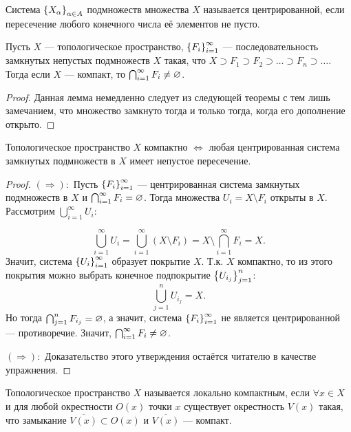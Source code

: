 \begin{definition}
    Система $\left\{X_{\alpha}\right\}_{\alpha \in A}$ подмножеств множества $X$ называется центрированной, если пересечение любого конечного числа её элементов не пусто.
\end{definition}

\begin{lemma}
    Пусть $X$ --- топологическое пространство, $\left\{F_{i}\right\}_{i = 1}^{\infty}$ --- последовательность замкнутых непустых подмножеств $X$ такая, что $X \supset F_1 \supset F_2 \supset \ldots \supset F_{n} \supset \ldots$. 
    Тогда если $X$ --- компакт, то $\bigcap_{i = 1}^{\infty} F_{i} \neq \varnothing$.
\end{lemma}
\begin{proof}
    Данная лемма немедленно следует из следующей теоремы с тем лишь замечанием, что множество замкнуто тогда и только тогда, когда его дополнение открыто.
\end{proof}

\begin{theorem}
    Топологическое пространство $X$ компактно $\Leftrightarrow$ любая центрированная система замкнутых подмножеств в $X$ имеет непустое пересечение. 
\end{theorem}
\begin{proof}{}
    $(\Rightarrow):$ Пусть $\left\{F_{i}\right\}_{i = 1}^{\infty}$ --- центрированная система замкнутых подмножеств в $X$ и $\bigcap_{i = 1}^{\infty} F_{i} = \varnothing$. Тогда множества $U_{i} = X \setminus F_{i}$ открыты в $X$.
    Рассмотрим $\bigcup_{i = 1}^{\infty} U_{i}$:

    \[
        \bigcup_{i = 1}^{\infty} U_{i} = \bigcup_{i = 1}^{\infty} (X \setminus F_{i}) = X \setminus \bigcap_{i = 1}^{\infty} F_{i} = X.
    \]
    Значит, система $\left\{U_{i}\right\}_{i = 1}^{\infty}$ образует покрытие $X$. Т.к. $X$ компактно, то из этого покрытия можно выбрать конечное подпокрытие $\left\{U_{i_j}\right\}_{j = 1}^{n}$:
    \[
        \bigcup_{j = 1}^{n} U_{i_j} = X.
    \]
    Но тогда $\bigcap_{j = 1}^{n} F_{i_j} = \varnothing$, а значит, система $\left\{F_{i}\right\}_{i = 1}^{\infty}$ не является центрированной --- противоречие. Значит, $\bigcap_{i = 1}^{\infty} F_{i} \neq \varnothing$.

    $(\Rightarrow):$ Доказательство этого утверждения остаётся читателю в качестве упражнения.
\end{proof}

\begin{definition}
    Топологическое пространство $X$ называется локально компактным, если $\forall x \in X$ и для любой окрестности $O(x)$ точки $x$ существует окрестность $V(x)$ такая, что
    замыкание $\overline{V(x)} \subset O(x)$ и $\overline{V(x)}$ --- компакт.
\end{definition}


